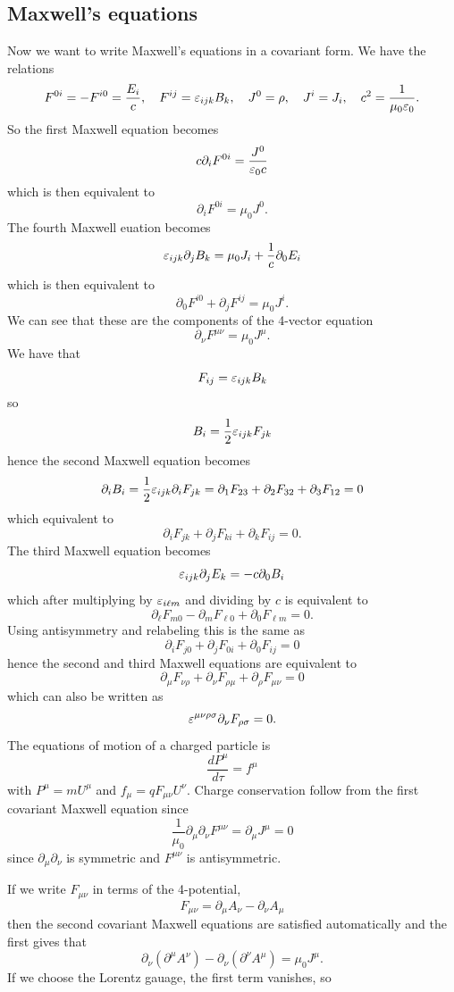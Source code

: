 \documentclass{article}
\begin{document}
\subsection{Maxwell's equations}
Now we want to write Maxwell's equations in a covariant form. We have the relations
\[
	F^{0i} = -F^{i0} = \frac{E_i}c,\quad F^{ij} = \varepsilon_{ijk}B_k, \quad J^0 = \rho, \quad J^i = J_i,\quad c^2=\frac 1{\mu_0\varepsilon_0}.
\]
So the first Maxwell equation becomes
\[
	c\partial_i F^{0i} = \frac{J^0}{\varepsilon_0 c}
\]
which is then equivalent to
\[
	\partial_i F^{0i} = \mu_0 J^0.
\]
The fourth Maxwell euation becomes
\[
	\varepsilon_{ijk}\partial_j B_k = \mu_0J_i + \frac1c \partial_0 E_i
\]
which is then equivalent to
\[
	\partial_0 F^{i0} + \partial_j F^{ij} = \mu_0 J^i.
\]
We can see that these are the components of the 4-vector equation
\[
	\partial_\nu F^{\mu\nu} = \mu_0 J^\mu.
\]
We have that
\[
	F_{ij} = \varepsilon_{ijk}B_k
\]
so
\[
	B_i = \frac 12 \varepsilon_{ijk}F_{jk}
\]
hence the second Maxwell equation becomes
\[
	\partial_i B_i = \frac 12 \varepsilon_{ijk} \partial_i F_{jk} = \partial_1 F_{23} + \partial_2 F_{32} + \partial_3 F_{12} = 0
\]
which equivalent to
\[
	\partial_i F_{jk} + \partial_jF_{ki} + \partial_kF_{ij} = 0.
\]
The third Maxwell equation becomes
\[
	\varepsilon_{ijk}\partial_j E_k = -c\partial_0 B_i
\]
which after multiplying by $ \varepsilon_{i\ell m} $ and dividing by $ c $ is equivalent to
\[
	\partial_\ell F_{m0} - \partial_m F_{\ell 0} + \partial_0 F_{\ell m} = 0.
\]
Using antisymmetry and relabeling this is the same as
\[
	\partial_i F_{j0} + \partial_j F_{0i} + \partial_0 F_{ij} = 0
\]
hence the second and third Maxwell equations are equivalent to
\[
	\partial_\mu F_{\nu\rho} + \partial_\nu F_{\rho \mu} + \partial_\rho F_{\mu\nu} = 0
\]
which can also be written as
\[
	\varepsilon^{\mu\nu\rho\sigma} \partial_\nu F_{\rho\sigma} = 0.
\]
The equations of motion of a charged particle is
\[
	\frac{d P^\mu}{d\tau} = f^\mu
\]
with $ P^\mu = mU^\mu $ and $ f_\mu = qF_{\mu\nu} U^\nu $. Charge conservation follow from the first covariant Maxwell equation since
\[
	\frac 1{\mu_0}\partial_\mu\partial_\nu F^{\mu\nu} = \partial_\mu J^\mu = 0
\]
since $ \partial_\mu\partial_\nu $ is symmetric and $ F^{\mu\nu} $ is antisymmetric.\par
If we write $ F_{\mu\nu} $ in terms of the 4-potential,
\[
	F_{\mu\nu} = \partial_\mu A_\nu - \partial_\nu A_\mu
\]
then the second covariant Maxwell equations are satisfied automatically and the first gives that
\[
	\partial_\nu(\partial^\mu A^\nu) - \partial_\nu(\partial^\nu A^\mu) = \mu_0 J^\mu.
\]
If we choose the Lorentz gauage, the first term vanishes, so
\end{document}
